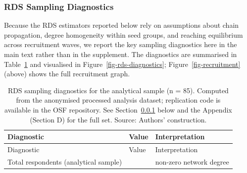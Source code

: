 \documentclass[
  12pt,
  letterpaper,
  DIV=11,
  numbers=noendperiod]{scrartcl}
\begin{document}
\subsubsection{RDS Sampling Diagnostics}\label{sec-rds-diagnostics}

Because the RDS estimators reported below rely on assumptions about
chain propagation, degree homogeneity within seed groups, and reaching
equilibrium across recruitment waves, we report the key sampling
diagnostics here in the main text rather than in the supplement. The
diagnostics are summarised in Table~\ref{tbl-rds-diagnostics} and
visualised in Figure~\ref{fig-rds-diagnostics};
Figure~\ref{fig-recruitment} (above) shows the full recruitment graph.

\begin{longtable}[]{@{}
  >{\raggedright\arraybackslash}p{}
  >{\centering\arraybackslash}p{}
  >{\raggedright\arraybackslash}p{}@{}}
\caption{RDS sampling diagnostics for the analytical sample (n = 85).
Computed from the anonymised processed analysis dataset; replication
code is available in the OSF repository. See
Section~\ref{sec-rds-diagnostics} below and the Appendix (Section D) for
the full set. Source: Authors'
construction.}\label{tbl-rds-diagnostics}\tabularnewline
\toprule\noalign{}
\begin{minipage}[b]{\linewidth}\raggedright
Diagnostic
\end{minipage} & \begin{minipage}[b]{\linewidth}\centering
Value
\end{minipage} & \begin{minipage}[b]{\linewidth}\raggedright
Interpretation
\end{minipage} \\
\midrule\noalign{}
\endfirsthead
\toprule\noalign{}
\begin{minipage}[b]{\linewidth}\raggedright
Diagnostic
\end{minipage} & \begin{minipage}[b]{\linewidth}\centering
Value
\end{minipage} & \begin{minipage}[b]{\linewidth}\raggedright
Interpretation
\end{minipage} \\
\midrule\noalign{}
\endhead
\bottomrule\noalign{}
\endlastfoot
Total respondents (analytical sample) & 85 & non-zero network degree \\

\end{longtable}
\end{document}
